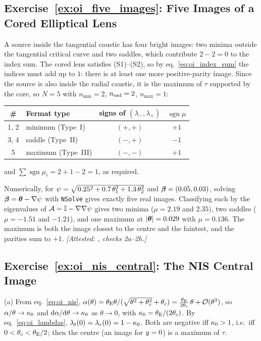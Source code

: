 \subsection*{Exercise~\ref{ex:oi_five_images}: Five Images of a Cored Elliptical Lens}

A source inside the tangential caustic has four bright images: two
minima outside the tangential critical curve and two saddles, which
contribute $2-2=0$ to the index sum.  The cored lens satisfies
(S1)--(S2), so by eq.~\eqref{eq:oi_index_sum} the indices must add up to
$1$: there is at least one more positive-parity image.  Since the source
is also inside the radial caustic, it is the maximum of $\tau$ supported
by the core, so $N=5$ with $n_{\min}=2$, $n_{\rm sad}=2$, $n_{\max}=1$:
\begin{center}
\begin{tabular}{clcc}
\toprule
\# & Fermat type & signs of $(\lambda_-,\lambda_+)$ & $\operatorname{sgn}\mu$\\
\midrule
1, 2 & minimum (Type~I)   & $(+,+)$ & $+1$\\
3, 4 & saddle (Type~II)   & $(-,+)$ & $-1$\\
5    & maximum (Type~III) & $(-,-)$ & $+1$\\
\bottomrule
\end{tabular}
\end{center}
and $\sum\operatorname{sgn}\mu_i=2+1-2=1$, as required.

Numerically, for
$\psi=\sqrt{0.25^2+0.7\,\theta_1^2+1.3\,\theta_2^2}$ and
$\boldsymbol{\beta}=(0.05,0.03)$, solving $\boldsymbol{\beta}=\boldsymbol{\theta}-\nabla\psi$ with
\texttt{NSolve} gives exactly five real images.  Classifying each by
the eigenvalues of $\mathcal{A}=\mathbb{I}-\nabla\nabla\psi$ gives two minima
($\mu=2.19$ and $2.35$), two saddles ($\mu=-1.51$ and $-1.21$), and one
maximum at $|\boldsymbol{\theta}|=0.029$ with $\mu=0.136$.  The maximum is both
the image closest to the centre and the faintest, and the parities sum
to $+1$.
\emph{[Attested: , checks 2a--2h.]}

\subsection*{Exercise~\ref{ex:oi_nis_central}: The NIS Central Image}

(a) From eq.~\eqref{eq:oi_nis},
$\alpha(\theta)=\theta_{\mathrm{E}}\theta/(\sqrt{\theta^2+\theta_c^2}+\theta_c)
=\tfrac{\theta_{\mathrm{E}}}{2\theta_c}\,\theta+\mathcal{O}(\theta^3)$, so
$\alpha/\theta\to\kappa_0$ and $\dd\alpha/\dd\theta\to\kappa_0$ as
$\theta\to0$, with $\kappa_0=\theta_{\mathrm{E}}/(2\theta_c)$.  By
eq.~\eqref{eq:oi_lambdas}, $\lambda_t(0)=\lambda_r(0)=1-\kappa_0$.  Both
are negative iff $\kappa_0>1$, i.e.\ iff $0<\theta_c<\theta_{\mathrm{E}}/2$; then
the centre (an image for $y=0$) is a maximum of $\tau$.

